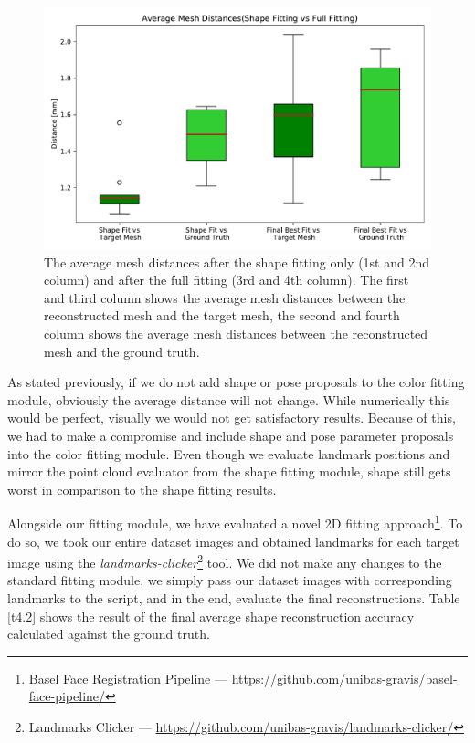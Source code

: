 \begin{figure}
  \centering
  \includegraphics[width=\textwidth]{Figures/our.pdf}
  \caption{The average mesh distances after the shape fitting only (1st and 2nd column) and after the full fitting (3rd and 4th column). The first and third column shows the average mesh distances between the reconstructed mesh and the target mesh, the second and fourth column shows the average mesh distances between the reconstructed mesh and the ground truth.}
  \label{f4.3}
\end{figure}

As stated previously, if we do not add shape or pose proposals to the color fitting module, obviously the average distance will not change. While numerically this would be perfect, visually we would not get satisfactory results. Because of this, we had to make a compromise and include shape and pose parameter proposals into the color fitting module. Even though we evaluate landmark positions and mirror the point cloud evaluator from the shape fitting module, shape still gets worst in comparison to the shape fitting results.\bigskip

Alongside our fitting module, we have evaluated a novel 2D fitting approach\footnote{Basel Face Registration Pipeline — \url{https://github.com/unibas-gravis/basel-face-pipeline/}}. To do so, we took our entire dataset images and obtained landmarks for each target image using the \textit{landmarks-clicker}\footnote{Landmarks Clicker
— \url{https://github.com/unibas-gravis/landmarks-clicker/}} tool. We did not make any changes to the standard fitting module, we simply pass our dataset images with corresponding landmarks to the script, and in the end, evaluate the final reconstructions. Table \ref{t4.2} shows the result of the final average shape reconstruction accuracy calculated against the ground truth.\bigskip

